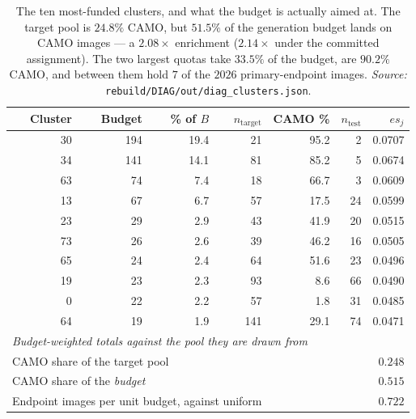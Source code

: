 \begin{table}[t]
\caption{The ten most-funded clusters, and what the budget is actually aimed at. The target pool is $24.8\%$ CAMO, but $51.5\%$ of the generation budget lands on CAMO images --- a $2.08\times$ enrichment ($2.14\times$ under the committed assignment). The two largest quotas take $33.5\%$ of the budget, are $90.2\%$ CAMO, and between them hold $7$ of the $2026$ primary-endpoint images. \emph{Source:} \texttt{rebuild/DIAG/out/diag\_clusters.json}.}
\label{tab:clustercomp}
\begin{center}
\small
\begin{tabular}{rrrrrrr}
\toprule
Cluster & Budget & \% of $B$ & $n_{\text{target}}$ & CAMO \% & $n_{\text{test}}$ & $\mathit{es}_j$ \\
\midrule
30 & 194 & 19.4 & 21 & 95.2 & 2 & 0.0707 \\
34 & 141 & 14.1 & 81 & 85.2 & 5 & 0.0674 \\
63 & 74 & 7.4 & 18 & 66.7 & 3 & 0.0609 \\
13 & 67 & 6.7 & 57 & 17.5 & 24 & 0.0599 \\
23 & 29 & 2.9 & 43 & 41.9 & 20 & 0.0515 \\
73 & 26 & 2.6 & 39 & 46.2 & 16 & 0.0505 \\
65 & 24 & 2.4 & 64 & 51.6 & 23 & 0.0496 \\
19 & 23 & 2.3 & 93 & 8.6 & 66 & 0.0490 \\
0 & 22 & 2.2 & 57 & 1.8 & 31 & 0.0485 \\
64 & 19 & 1.9 & 141 & 29.1 & 74 & 0.0471 \\
\midrule
\multicolumn{7}{l}{\emph{Budget-weighted totals against the pool they are drawn from}} \\
\multicolumn{4}{l}{CAMO share of the target pool} & \multicolumn{3}{r}{$0.248$} \\
\multicolumn{4}{l}{CAMO share of the \emph{budget}} & \multicolumn{3}{r}{$\mathbf{0.515}$} \\
\multicolumn{4}{l}{Endpoint images per unit budget, against uniform} & \multicolumn{3}{r}{$0.722$} \\
\bottomrule
\end{tabular}
\end{center}
\end{table}
